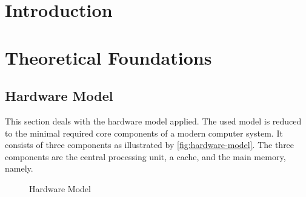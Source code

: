\documentclass[onecolumn, openany, master, english, seal, signatures]{dbrgrptt}
\begin{document}

%
\thesisdate{\today}%
%
%

\frontmatter%

%

\mainmatter%

\chapter{Introduction}\label{cha:introduction}

\chapter{Theoretical Foundations}\label{cha:theoretical-foundations}

\section{Hardware Model}\label{sec:hardware-model}

This section deals with the hardware model applied. The used model is reduced to the minimal required core components of a modern computer system. It consists of three components as illustrated by \autoref{fig:hardware-model}. The three components are the central processing unit, a cache, and the main memory, namely.

\begin{figure}[h!]
  \centering
  
  \caption{Hardware Model}
  \label{fig:hardware-model}
\end{figure}
\end{document}
